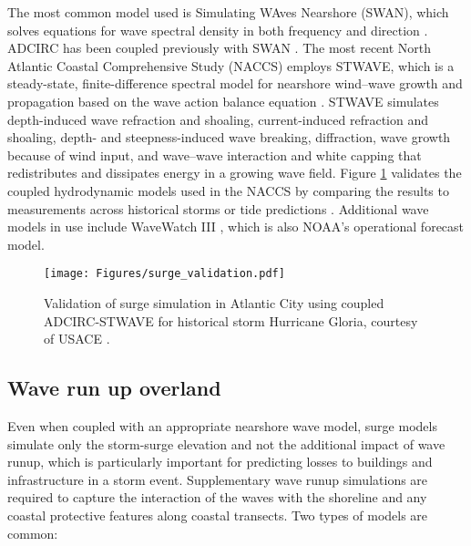 The most common model used is Simulating WAves Nearshore (SWAN), which solves equations for wave spectral density in both frequency and direction \citep{zijlema2010computation}. ADCIRC has been coupled previously with SWAN \citep{dietrich2011modeling,kennedy2012tropical}. The most recent North Atlantic Coastal Comprehensive Study (NACCS) \citep{usace2015north} employs STWAVE, which is a steady-state, finite-difference spectral model for nearshore wind--wave growth and propagation based on the wave action balance equation \citep{smith2001stwave}. STWAVE simulates depth-induced wave refraction and shoaling, current-induced refraction and shoaling, depth- and steepness-induced wave breaking, diffraction, wave growth because of wind input, and wave--wave interaction and white capping that redistributes and dissipates energy in a growing wave field. Figure \ref{fig:surge_validation} validates the coupled hydrodynamic models used in the NACCS by comparing the results to measurements across historical storms or tide predictions \citep{nadal-caraballo2015north}. Additional wave models in use include WaveWatch III \citep{smith2018validation}, which is also NOAA's operational forecast model. 

\begin{figure}[htb]
    \centering
    \texttt{[image: Figures/surge\_validation.pdf]}
    \caption{Validation of surge simulation in Atlantic City using coupled ADCIRC-STWAVE for historical storm Hurricane Gloria, courtesy of USACE \citep{nadal-caraballo2015north}.}
    \label{fig:surge_validation}
\end{figure}

\subsection{Wave run up overland}

Even when coupled with an appropriate nearshore wave model, surge models simulate only the storm-surge elevation and not the additional impact of wave runup, which is particularly important for predicting losses to buildings and infrastructure in a storm event. Supplementary wave runup simulations are required to capture the interaction of the waves with the shoreline and any coastal protective features along coastal transects. Two types of models are common:

